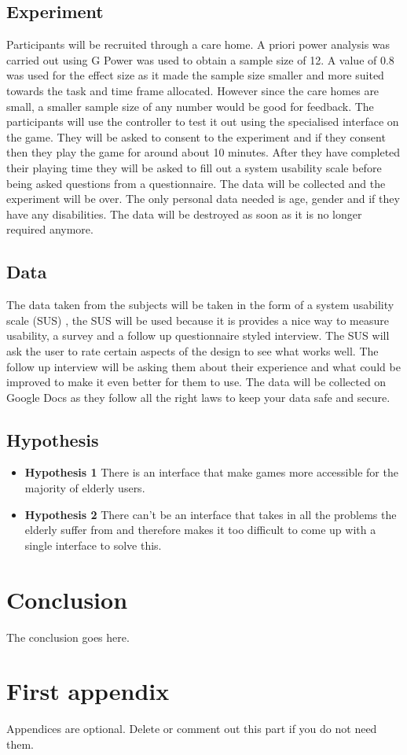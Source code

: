 \documentclass[journal]{IEEEtran}
\begin{document}
\subsection{Experiment}
Participants will be recruited through a care home. A priori power analysis was carried out using G Power \cite{noauthor_universitat_nodate} was used to obtain a sample size of 12. A value of 0.8 was used for the effect size as it made the sample size smaller and more suited towards the task and time frame allocated. However since the care homes are small, a smaller sample size of any number would be good for feedback.  The participants will use the controller to test it out using the specialised interface on the game. They will be asked to consent to the experiment and if they consent then they play the game for around about 10 minutes. After they have completed their playing time they will be asked to fill out a system usability scale before being asked questions from a questionnaire. The data will be collected and the experiment will be over. The only personal data needed is age, gender and if they have any disabilities. The data will be destroyed as soon as it is no longer required anymore. 

\subsection{Data}
The data taken from the subjects will be taken in the form of a system usability scale (SUS) \cite{affairs_system_2013}, the SUS will be used because it is provides a nice way to measure usability, a survey and a follow up questionnaire styled interview. The SUS will ask the user to rate certain aspects of the design to see what works well. The follow up interview will be asking them about their experience and what could be improved to make it even better for them to use. The data will be collected on Google Docs as they follow all the right laws to keep your data safe and secure. 

\subsection{Hypothesis}
\begin{itemize}
	\item \textbf{Hypothesis 1} There is an interface that make games more accessible for the majority of elderly users.
	\item \textbf{Hypothesis 2} There can't be an interface that takes in all the problems the elderly suffer from and therefore makes it too difficult to come up with a single interface to solve this.
\end{itemize}


\section{Conclusion}
The conclusion goes here.






\appendices
\section{First appendix}
Appendices are optional. Delete or comment out this part if you do not need them.

\end{document}
